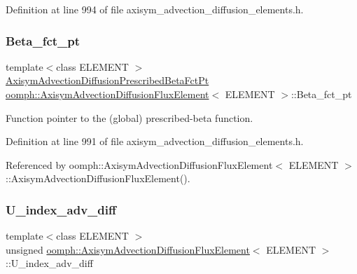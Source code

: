 Definition at line 994 of file axisym\+\_\+advection\+\_\+diffusion\+\_\+elements.\+h.

\mbox{\label{classoomph_1_1AxisymAdvectionDiffusionFluxElement_a410eebdc595edf787822c63e98766beb}} 
\subsubsection{\texorpdfstring{Beta\+\_\+fct\+\_\+pt}{Beta\_fct\_pt}}
{\footnotesize\ttfamily template$<$class E\+L\+E\+M\+E\+NT $>$ \\
\hyperlink{classoomph_1_1AxisymAdvectionDiffusionFluxElement_ad4453706dae676758946691686e1a1c3}{Axisym\+Advection\+Diffusion\+Prescribed\+Beta\+Fct\+Pt} \hyperlink{classoomph_1_1AxisymAdvectionDiffusionFluxElement}{oomph\+::\+Axisym\+Advection\+Diffusion\+Flux\+Element}$<$ E\+L\+E\+M\+E\+NT $>$\+::Beta\+\_\+fct\+\_\+pt\hspace{0.3cm}{\ttfamily [private]}}



Function pointer to the (global) prescribed-\/beta function. 



Definition at line 991 of file axisym\+\_\+advection\+\_\+diffusion\+\_\+elements.\+h.



Referenced by oomph\+::\+Axisym\+Advection\+Diffusion\+Flux\+Element$<$ E\+L\+E\+M\+E\+N\+T $>$\+::\+Axisym\+Advection\+Diffusion\+Flux\+Element().

\mbox{\label{classoomph_1_1AxisymAdvectionDiffusionFluxElement_a9a1a5af501dd6839ffdfe132a2f9c515}} 
\subsubsection{\texorpdfstring{U\+\_\+index\+\_\+adv\+\_\+diff}{U\_index\_adv\_diff}}
{\footnotesize\ttfamily template$<$class E\+L\+E\+M\+E\+NT $>$ \\
unsigned \hyperlink{classoomph_1_1AxisymAdvectionDiffusionFluxElement}{oomph\+::\+Axisym\+Advection\+Diffusion\+Flux\+Element}$<$ E\+L\+E\+M\+E\+NT $>$\+::U\+\_\+index\+\_\+adv\+\_\+diff\hspace{0.3cm}{\ttfamily [private]}}



